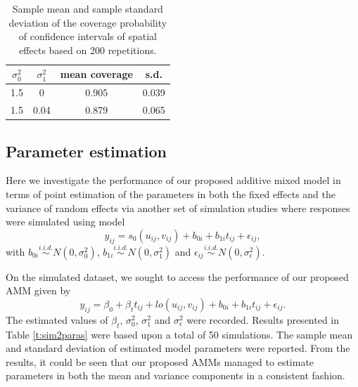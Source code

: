 	\begin{table}[H]
		\caption{Sample mean and sample standard deviation of the coverage probability of confidence intervals of spatial effects based on 200 repetitions.
			\label{t:sim2coverage}}
		\centering
		\begin{tabular}{cccc}
			\hline
			$\sigma_0^2$ & $\sigma_{1}^2$ & mean coverage & s.d. \\
			\hline
			1.5 & 0 & 0.905 & 0.039\\
			1.5 & 0.04 & 0.879 & 0.065\\
			\hline
		\end{tabular}
	\end{table}
	
	
	\subsection{Parameter estimation}
	Here we investigate the performance of our proposed additive mixed model in terms of point estimation of the parameters in both the fixed effects and the variance of random effects via another set of simulation studies where responses were simulated using model 
	\begin{equation}\label{eq:simrand}
	y_{ij} = s_0(u_{ij},v_{ij}) + b_{0i} + b_{1i}t_{ij} + \epsilon_{ij},
	\end{equation}
	with $b_{0i} \stackrel{i.i.d.}{\sim} N(0,\sigma_{0}^2)$, $b_{1i} \stackrel{i.i.d.}{\sim} N(0,\sigma_{1}^2)$ and $\epsilon_{ij} \stackrel{i.i.d.}{\sim} N(0,\sigma_\epsilon^2)$. %
	
	On the simulated dataset, we sought to access the performance of our proposed AMM given by 
	\begin{equation}\label{mod:ammsim2}
	y_{ij} = \beta_0 + \beta_t t_{ij} + lo(u_{ij},v_{ij}) + b_{0i} + b_{1i}t_{ij} + \epsilon_{ij}.
	\end{equation}
	The estimated values of $\beta_t$, $\sigma_{0}^2$, $\sigma_{1}^2$ and $\sigma_\epsilon^2$ were recorded. Results presented in Table \ref{t:sim2paras} were based upon a total of 50 simulations. The sample mean and standard deviation of estimated model parameters were reported. From the results, it could be seen that our proposed AMMs managed to estimate parameters in both the mean and variance components in a consistent fashion.
	
